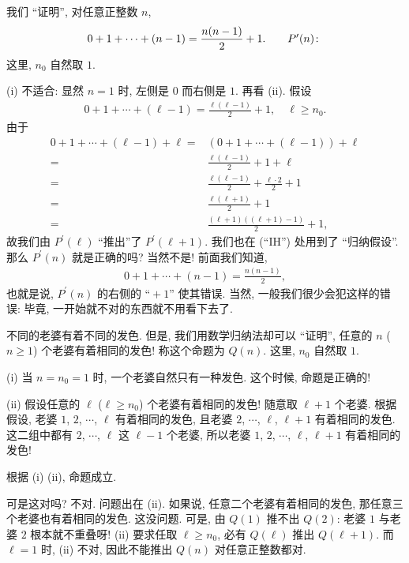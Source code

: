 \begin{example}
    我们 ``证明'', 对任意正整数 $n$,
    \begin{align*}
        0 + 1 + \cdots + (n - 1) = \frac{n(n-1)}{2} + 1. \tag*{$P^{\prime}(n) \colon$}
    \end{align*}
    这里, $n_0$ 自然取 $1$.

    (i) 不适合: 显然 $n=1$ 时, 左侧是 $0$ 而右侧是 $1$. 再看 (ii). 假设
    \begin{align*}
        0 + 1 + \cdots + (\ell - 1) = \frac{\ell(\ell-1)}{2} + 1, \quad \ell \geq n_0.
    \end{align*}
    由于
    \begin{align*}
        0 + 1 + \cdots + (\ell - 1) + \ell
        = {} & (0 + 1 + \cdots + (\ell - 1)) + \ell                \\
        = {} & \frac{\ell(\ell-1)}{2} + 1 + \ell \tag*{(``IH'')}   \\
        = {} & \frac{\ell(\ell-1)}{2} + \frac{\ell \cdot 2}{2} + 1 \\
        = {} & \frac{\ell(\ell+1)}{2} + 1                          \\
        = {} & \frac{(\ell+1)((\ell+1) - 1)}{2} + 1,
    \end{align*}
    故我们由 $P^{\prime}(\ell)$ ``推出''了 $P^{\prime}(\ell + 1)$. 我们也在 (``IH'') 处用到了 ``归纳假设''. 那么 $P^{\prime}(n)$ 就是正确的吗? 当然不是! 前面我们知道,
    \begin{align*}
        0 + 1 + \cdots + (n - 1) = \frac{n(n-1)}{2},
    \end{align*}
    也就是说, $P^{\prime}(n)$ 的右侧的 ``${} + 1$'' 使其错误. 当然, 一般我们很少会犯这样的错误: 毕竟, 一开始就不对的东西就不用看下去了.
\end{example}

\begin{example}
    不同的老婆有着不同的发色. 但是, 我们用数学归纳法却可以 ``证明'', 任意的 $n$ ($n \geq 1$) 个老婆有着相同的发色! 称这个命题为 $Q(n)$. 这里, $n_0$ 自然取 $1$.

    (i) 当 $n=n_0=1$ 时, 一个老婆自然只有一种发色. 这个时候, 命题是正确的!

    (ii) 假设任意的 $\ell$ ($\ell \geq n_0$) 个老婆有着相同的发色! 随意取 $\ell + 1$ 个老婆. 根据假设, 老婆 $1$, $2$, $\cdots$, $\ell$ 有着相同的发色, 且老婆 $2$, $\cdots$, $\ell$, $\ell+1$ 有着相同的发色. 这二组中都有 $2$, $\cdots$, $\ell$ 这 $\ell-1$ 个老婆, 所以老婆 $1$, $2$, $\cdots$, $\ell$, $\ell+1$ 有着相同的发色!

    根据 (i) (ii), 命题成立.

    可是这对吗? 不对. 问题出在 (ii). 如果说, 任意二个老婆有着相同的发色, 那任意三个老婆也有着相同的发色. 这没问题. 可是, 由 $Q(1)$ 推不出 $Q(2)$: 老婆 $1$ 与老婆 $2$ 根本就不重叠呀! (ii) 要求任取 $\ell \geq n_0$, 必有 $Q(\ell)$ 推出 $Q(\ell+1)$. 而 $\ell = 1$ 时, (ii) 不对, 因此不能推出 $Q(n)$ 对任意正整数都对.
\end{example}

